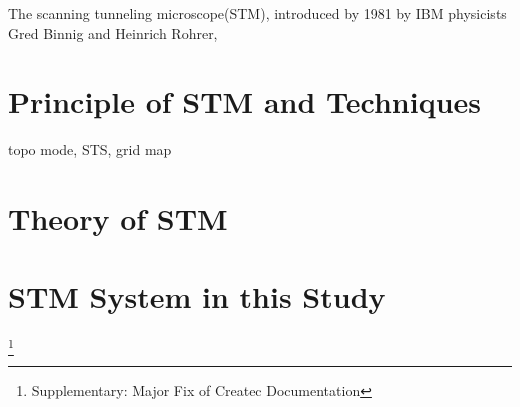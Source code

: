  
The scanning tunneling microscope(STM), introduced by 1981 by IBM physicists Gred Binnig and Heinrich Rohrer,

\section{Principle of STM and Techniques}


topo mode, STS, grid map
\section{Theory of STM}
\section{STM System in this Study}
\footnote{Supplementary: Major Fix of Createc Documentation}

